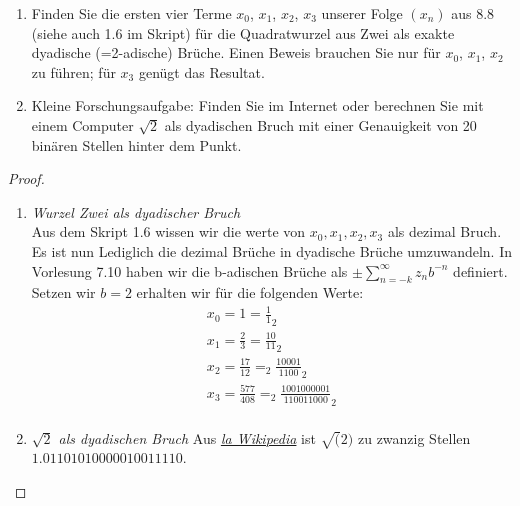 \documentclass{../problemset}
\begin{document}
\begin{problem}
$ $ \\
\begin{enumerate}
	\item Finden Sie die ersten vier Terme $x_0$, $x_1$, $x_2$, $x_3$ unserer Folge $(x_n)$ aus 8.8 (siehe auch 1.6 im Skript) für die Quadratwurzel aus Zwei als exakte dyadische (=2-adische) Brüche. Einen Beweis brauchen Sie nur für $x_0$, $x_1$, $x_2$ zu führen; für $x_3$ genügt das Resultat.
	\item Kleine Forschungsaufgabe: Finden Sie im Internet oder berechnen Sie mit einem Computer \(\sqrt{2}\) als dyadischen Bruch mit einer Genauigkeit von 20 binären Stellen hinter dem Punkt.
\end{enumerate}

\begin{proof}
	\begin{enumerate}
		\item \textit{Wurzel Zwei als dyadischer Bruch} \\
		      Aus dem Skript 1.6 wissen wir die werte von $x_0, x_1, x_2, x_3$ als dezimal Bruch.
		      Es ist nun Lediglich die dezimal Brüche in dyadische Brüche umzuwandeln.
		      In Vorlesung 7.10 haben wir die b-adischen Brüche als $\pm \sum_{n=-k}^{\infty}z_nb^{-n}$ definiert.
		      Setzen wir $b=2$ erhalten wir für die folgenden Werte: \begin{align*}
			      x_0 = 1 = \frac{1}{1}_2                                  \\
			      x_1 = \frac{2}{3} = \frac{10}{11}_2                      \\
			      x_2 = \frac{17}{12} =_2 \frac{10001}{1100}_2             \\
			      x_3 = \frac{577}{408} =_2 \frac{1001000001}{110011000}_2 \\
		      \end{align*}
		\item \textit{$\sqrt{2}$ als dyadischen Bruch}
		      Aus \href{https://en.wikipedia.org/wiki/Square_root_of_2}{\textit{la Wikipedia}} ist $\sqrt(2)$ zu zwanzig Stellen $1.01101010000010011110$.

	\end{enumerate}
\end{proof}

\end{problem}
\end{document}
